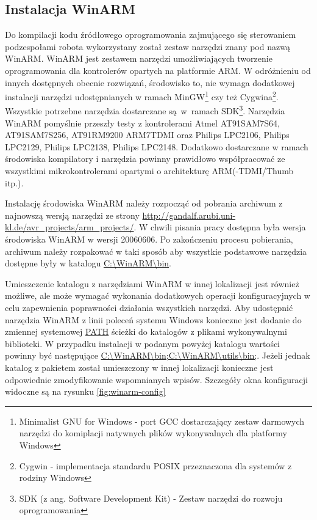 \subsection{Instalacja WinARM}
Do kompilacji kodu źródłowego oprogramowania zajmującego się sterowaniem
podzespołami robota wykorzystany został zestaw narzędzi znany pod nazwą WinARM.
WinARM jest zestawem narzędzi umożliwiających tworzenie oprogramowania dla
kontrolerów opartych na platformie ARM. W odróżnieniu od innych dostępnych
obecnie rozwiązań, środowisko to, nie wymaga dodatkowej instalacji narzędzi
udostępnianych w ramach MinGW\footnote{Minimalist GNU for Windows - port GCC
dostarczający zestaw darmowych narzędzi do komiplacji natywnych plików
wykonywalnych dla platformy Windows} czy też Cygwina\footnote{Cygwin -
implementacja standardu POSIX przeznaczona dla systemów z rodziny Windows}.
Wszystkie potrzebne narzędzia dostarczane są~w~ramach SDK\footnote{SDK (z ang.
Software Development Kit) - Zestaw narzędzi do rozwoju oprogramowania}. Narzędzia
WinARM pomyślnie przeszły testy z kontrolerami Atmel AT91SAM7S64, AT91SAM7S256,
AT91RM9200 ARM7TDMI oraz Philips LPC2106, Philips LPC2129, Philips LPC2138,
Philips LPC2148. Dodatkowo dostarczane w ramach środowiska kompilatory i
narzędzia powinny prawidłowo współpracować ze wszystkimi mikrokontrolerami
opartymi o architekturę ARM(-TDMI/Thumb itp.).

Instalację środowiska WinARM należy rozpocząć od pobrania archiwum z najnowszą
wersją narzędzi ze strony
\url{http://gandalf.arubi.uni-kl.de/avr_projects/arm_projects/}. W chwili pisania
pracy dostępna była wersja środowiska WinARM w wersji 20060606. Po zakończeniu
procesu pobierania, archiwum należy rozpakować w taki sposób aby wszystkie
podstawowe narzędzia dostępne były w katalogu \url{C:\WinARM\bin}. 

Umieszczenie katalogu z narzędziami WinARM w innej lokalizacji jest również możliwe, ale może
wymagać wykonania dodatkowych operacji konfiguracyjnych w celu zapewnienia
poprawności działania wszystkich narzędzi. Aby udostępnić narzędzia WinARM z
linii poleceń systemu Windows konieczne jest dodanie do zmiennej systemowej
\url{PATH} ścieżki do katalogów z plikami wykonywalnymi biblioteki. W przypadku
instalacji w podanym powyżej katalogu wartości powinny być następujące
\url{C:\WinARM\bin;C:\WinARM\utils\bin;}. Jeżeli jednak katalog z pakietem
został umieszczony w innej lokalizacji konieczne jest odpowiednie zmodyfikowanie
wspomnianych wpisów. Szczegóły okna konfiguracji widoczne są na rysunku
\ref{fig:winarm-config}

